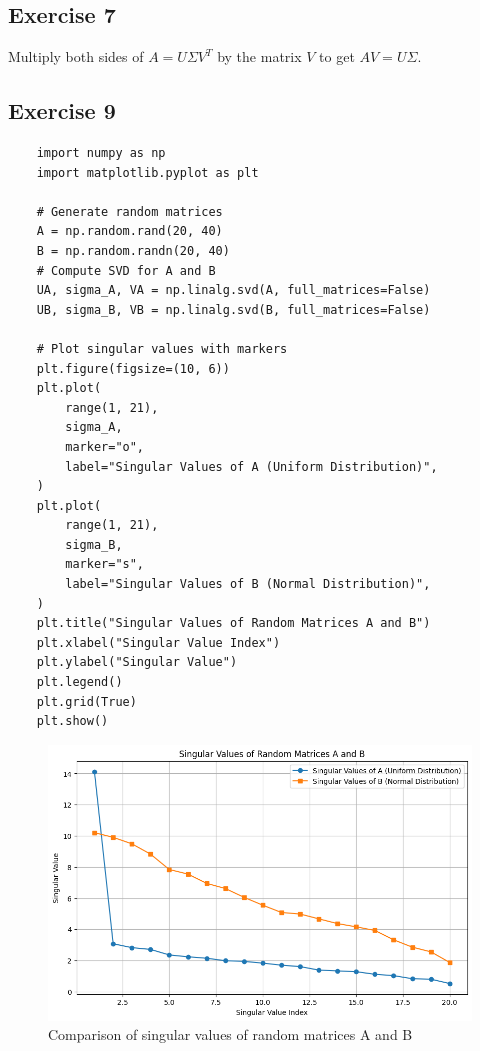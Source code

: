 \documentclass{article}
\begin{document}
\subsection{Exercise 7}
Multiply both sides of $A = U \Sigma V^{T}$ by the matrix $V$ to get $AV = U \Sigma$.

\subsection{Exercise 9}
\begin{verbatim}
    import numpy as np
    import matplotlib.pyplot as plt

    # Generate random matrices
    A = np.random.rand(20, 40)
    B = np.random.randn(20, 40)
    # Compute SVD for A and B
    UA, sigma_A, VA = np.linalg.svd(A, full_matrices=False)
    UB, sigma_B, VB = np.linalg.svd(B, full_matrices=False)

    # Plot singular values with markers
    plt.figure(figsize=(10, 6))
    plt.plot(
        range(1, 21),
        sigma_A,
        marker="o",
        label="Singular Values of A (Uniform Distribution)",
    )
    plt.plot(
        range(1, 21),
        sigma_B,
        marker="s",
        label="Singular Values of B (Normal Distribution)",
    )
    plt.title("Singular Values of Random Matrices A and B")
    plt.xlabel("Singular Value Index")
    plt.ylabel("Singular Value")
    plt.legend()
    plt.grid(True)
    plt.show()
\end{verbatim}

\begin{figure}[ht]
    \centering
    \includegraphics[width=1\textwidth]{img/singular_value_index.png}
    \caption{Comparison of singular values of random matrices A and B}
    \label{fig:singular_value_index}
\end{figure}
\end{document}
